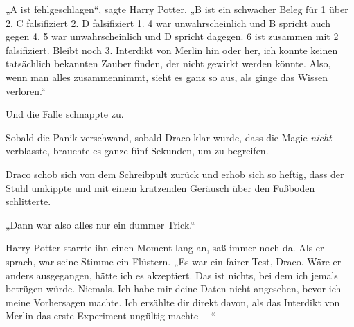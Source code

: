 „A ist fehlgeschlagen“, sagte Harry Potter.
„B ist ein schwacher Beleg für 1 über 2. C falsifiziert 2. D falsifiziert 1. 4 war unwahrscheinlich und B spricht auch gegen 4. 5 war unwahrscheinlich und D spricht dagegen. 6 ist zusammen mit 2 falsifiziert. Bleibt noch 3. Interdikt von Merlin hin oder her, ich konnte keinen tatsächlich bekannten Zauber finden, der nicht gewirkt werden könnte. Also, wenn man alles zusammennimmt, sieht es ganz so aus, als ginge das Wissen verloren.“

Und die Falle schnappte zu.

Sobald die Panik verschwand, sobald Draco klar wurde, dass die Magie \emph{nicht} verblasste, brauchte es ganze fünf Sekunden, um zu begreifen.

Draco schob sich von dem Schreibpult zurück und erhob sich so heftig, dass der Stuhl umkippte und mit einem kratzenden Geräusch über den Fußboden schlitterte.

„Dann war also alles nur ein dummer Trick.“

Harry Potter starrte ihn einen Moment lang an, saß immer noch da. Als er sprach, war seine Stimme ein Flüstern.
„Es war ein fairer Test, Draco. Wäre er anders ausgegangen, hätte ich es akzeptiert. Das ist nichts, bei dem ich jemals betrügen würde. Niemals. Ich habe mir deine Daten nicht angesehen, bevor ich meine Vorhersagen machte. Ich erzählte dir direkt davon, als das Interdikt von Merlin das erste Experiment ungültig machte —“

